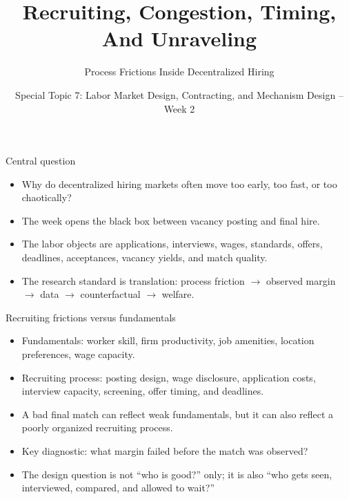 \documentclass[aspectratio=169,11pt]{beamer}
\title{Recruiting, Congestion, Timing, And Unraveling}
\subtitle{Process Frictions Inside Decentralized Hiring}
\author{Special Topic 7: Labor Market Design, Contracting, and Mechanism Design -- Week 2}
\date{}
\begin{document}
\begin{frame}
  \titlepage
\end{frame}

\begin{frame}{Central question}
\begin{itemize}
    \item Why do decentralized hiring markets often move too early, too fast, or too chaotically?
    \item The week opens the black box between vacancy posting and final hire.
    \item The labor objects are applications, interviews, wages, standards, offers, deadlines, acceptances, vacancy yields, and match quality.
    \item The research standard is translation: process friction $\rightarrow$ observed margin $\rightarrow$ data $\rightarrow$ counterfactual $\rightarrow$ welfare.
\end{itemize}
\end{frame}

\begin{frame}{Recruiting frictions versus fundamentals}
\begin{itemize}
    \item Fundamentals: worker skill, firm productivity, job amenities, location preferences, wage capacity.
    \item Recruiting process: posting design, wage disclosure, application costs, interview capacity, screening, offer timing, and deadlines.
    \item A bad final match can reflect weak fundamentals, but it can also reflect a poorly organized recruiting process.
    \item Key diagnostic: what margin failed before the match was observed?
    \item The design question is not ``who is good?'' only; it is also ``who gets seen, interviewed, compared, and allowed to wait?''
\end{itemize}
\end{frame}
\end{document}
